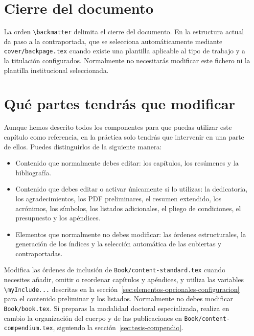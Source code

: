 \section{Cierre del documento}
\label{sec:cierre-documento}

La orden \texttt{\textbackslash{}backmatter} delimita el cierre del documento. En la estructura actual da paso a la contraportada, que se selecciona automáticamente mediante \texttt{cover/backpage.tex} cuando existe una plantilla aplicable al tipo de trabajo y a la titulación configurados. Normalmente no necesitarás modificar este fichero ni la plantilla institucional seleccionada.

\section{Qué partes tendrás que modificar}
\label{sec:partes-modificar}

Aunque hemos descrito todos los componentes para que puedas utilizar este capítulo como referencia, en la práctica solo tendrás que intervenir en una parte de ellos. Puedes distinguirlos de la siguiente manera:

\begin{itemize}
  \item Contenido que normalmente debes editar: los capítulos, los resúmenes y la bibliografía.
  \item Contenido que debes editar o activar únicamente si lo utilizas: la dedicatoria, los agradecimientos, los PDF preliminares, el resumen extendido, los acrónimos, los símbolos, los listados adicionales, el pliego de condiciones, el presupuesto y los apéndices.
  \item Elementos que normalmente no debes modificar: las órdenes estructurales, la generación de los índices y la selección automática de las cubiertas y contraportadas.
\end{itemize}

Modifica las órdenes de inclusión de \texttt{Book/content-standard.tex} cuando necesites añadir, omitir o reordenar capítulos y apéndices, y utiliza las variables \texttt{\textbackslash{}myInclude...} descritas en la sección~\ref{sec:elementos-opcionales-configuracion} para el contenido preliminar y los listados. Normalmente no debes modificar \texttt{Book/book.tex}. Si preparas la modalidad doctoral especializada, realiza en cambio la organización del cuerpo y de las publicaciones en \texttt{Book/content-compendium.tex}, siguiendo la sección~\ref{sec:tesis-compendio}.

